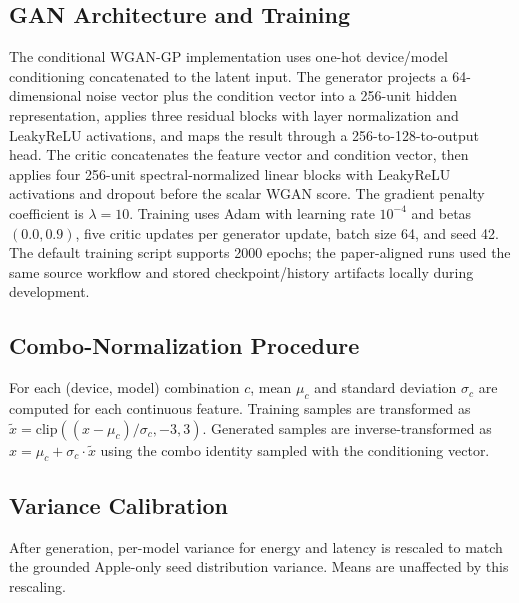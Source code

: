 \documentclass[conference]{IEEEtran}
\begin{document}
\subsection{GAN Architecture and Training}
The conditional WGAN-GP implementation uses one-hot device/model conditioning
concatenated to the latent input. The generator projects a 64-dimensional noise
vector plus the condition vector into a 256-unit hidden representation, applies
three residual blocks with layer normalization and LeakyReLU activations, and
maps the result through a 256-to-128-to-output head. The critic concatenates
the feature vector and condition vector, then applies four 256-unit
spectral-normalized linear blocks with LeakyReLU activations and dropout before
the scalar WGAN score. The gradient penalty coefficient is $\lambda = 10$.
Training uses Adam with learning rate $10^{-4}$ and betas $(0.0, 0.9)$, five
critic updates per generator update, batch size 64, and seed 42. The default
training script supports 2000 epochs; the paper-aligned runs used the same
source workflow and stored checkpoint/history artifacts locally during
development.

\subsection{Combo-Normalization Procedure}
For each (device, model) combination $c$, mean $\mu_c$ and standard deviation
$\sigma_c$ are computed for each continuous feature. Training samples are
transformed as $\tilde{x} = \mathrm{clip}((x - \mu_c)/\sigma_c, -3, 3)$.
Generated samples are inverse-transformed as $x = \mu_c + \sigma_c \cdot \tilde{x}$
using the combo identity sampled with the conditioning vector.

\subsection{Variance Calibration}
After generation, per-model variance for energy and latency is rescaled to
match the grounded Apple-only seed distribution variance. Means are unaffected
by this rescaling.
\end{document}
